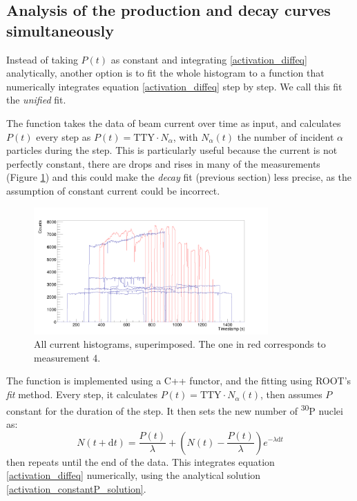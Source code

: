 \documentclass[a4paper,12pt]{report}
\newcommand{\dif}{\text{d}}
\newcommand{\Piso}{\textsuperscript{30}P }
\begin{document}
\subsection{Analysis of the production and decay curves simultaneously}
Instead of taking $P(t)$ as constant and integrating \ref{activation_diffeq} analytically, another option is to fit the whole histogram to a function that numerically integrates equation \ref{activation_diffeq} step by step.
We call this fit the \textit{unified} fit.

The function takes the data of beam current over time as input, and calculates $P(t)$ every step as $P(t) = \text{TTY}\cdot N_\alpha$, with $N_\alpha(t)$ the number of incident $\alpha$ particles during the step.
This is particularly useful because the current is not perfectly constant, there are drops and rises in many of the measurements (Figure \ref{current_histograms}) and this could make the \textit{decay} fit (previous section) less precise, as the assumption of constant current could be incorrect.
\\
\begin{figure}[H]
	\centering
	\includegraphics[width=0.80\textwidth]{current_histograms.png}
	\caption{All current histograms, superimposed.
	The one in red corresponds to measurement 4.}
	\label{current_histograms}
\end{figure}

The function is implemented using a C++ functor, and the fitting using ROOT's \textit{fit} method.
Every step, it calculates $P(t) = \text{TTY}\cdot N_\alpha(t)$, then assumes $P$ constant for the duration of the step.
It then sets the new number of \Piso nuclei as:
\begin{equation}
	N(t+\dif t)=\frac{P(t)}{\lambda} + \left( N(t)-\frac{P(t)}{\lambda} \right) e^{-\lambda \dif t}
\end{equation}
then repeats until the end of the data.
This integrates equation \ref{activation_diffeq} numerically, using the analytical solution \ref{activation_constantP_solution}.
\end{document}
